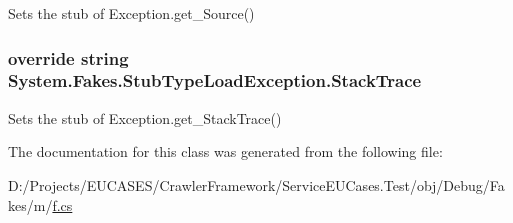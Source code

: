 Sets the stub of Exception.\-get\-\_\-\-Source()

\hypertarget{class_system_1_1_fakes_1_1_stub_type_load_exception_a838aeb139aec137592cc1cc6a3227f29}{
\subsubsection[{Stack\-Trace}]{\setlength{\rightskip}{0pt plus 5cm}override string System.\-Fakes.\-Stub\-Type\-Load\-Exception.\-Stack\-Trace\hspace{0.3cm}{\ttfamily [get]}}}\label{class_system_1_1_fakes_1_1_stub_type_load_exception_a838aeb139aec137592cc1cc6a3227f29}


Sets the stub of Exception.\-get\-\_\-\-Stack\-Trace()



The documentation for this class was generated from the following file\-:\begin{DoxyCompactItemize}
\item 
D\-:/\-Projects/\-E\-U\-C\-A\-S\-E\-S/\-Crawler\-Framework/\-Service\-E\-U\-Cases.\-Test/obj/\-Debug/\-Fakes/m/\hyperlink{m_2f_8cs}{f.\-cs}\end{DoxyCompactItemize}
